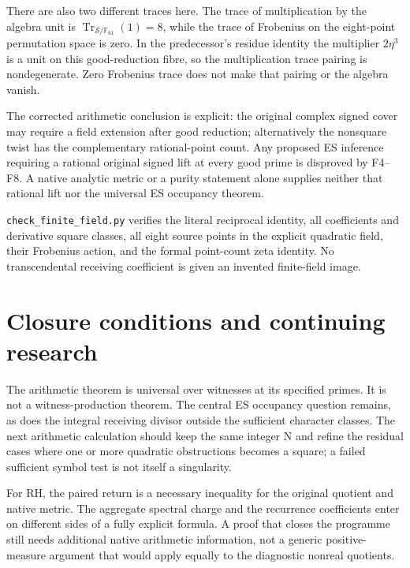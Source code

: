 There are also two different traces here. The trace of multiplication by
the algebra unit is
\(\operatorname{Tr}_{\mathscr S/\mathbb F_{61}}(1)=8\), while the trace
of Frobenius on the eight-point permutation space is zero. In the
predecessor's residue identity the multiplier \(2\eta^3\) is a unit on
this good-reduction fibre, so the multiplication trace pairing is
nondegenerate. Zero Frobenius trace does not make that pairing or the
algebra vanish.

The corrected arithmetic conclusion is explicit: the original complex
signed cover may require a field extension after good reduction;
alternatively the nonsquare twist has the complementary rational-point
count. Any proposed ES inference requiring a rational original signed
lift at every good prime is disproved by F4--F8. A native analytic
metric or a purity statement alone supplies neither that rational lift
nor the universal ES occupancy theorem.

\texttt{check\_finite\_field.py} verifies the literal reciprocal
identity, all coefficients and derivative square classes, all eight
source points in the explicit quadratic field, their Frobenius action,
and the formal point-count zeta identity. No transcendental receiving
coefficient is given an invented finite-field image.

\newpage

\section{Closure conditions and continuing
research}\label{closure-conditions-and-continuing-research}

The arithmetic theorem is universal over witnesses at its specified
primes. It is not a witness-production theorem. The central ES occupancy
question remains, as does the integral receiving divisor outside the
sufficient character classes. The next arithmetic calculation should
keep the same integer N and refine the residual cases where one or more
quadratic obstructions becomes a square; a failed sufficient symbol test
is not itself a singularity.

For RH, the paired return is a necessary inequality for the original
quotient and native metric. The aggregate spectral charge and the
recurrence coefficients enter on different sides of a fully explicit
formula. A proof that closes the programme still needs additional native
arithmetic information, not a generic positive-measure argument that
would apply equally to the diagnostic nonreal quotients.

